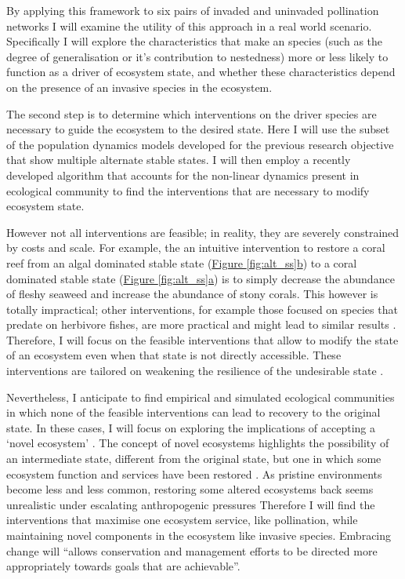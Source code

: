 \documentclass[a4paper]{article}
\begin{document}
By applying this framework to six pairs of invaded and uninvaded pollination networks \autocite{Bartomeus2008} I will examine the utility of this approach in a real world scenario.
Specifically I will explore the characteristics that make an species (such as the degree of generalisation or it's contribution to nestedness) more or less likely to function as a driver of ecosystem state, and whether these characteristics depend on the presence of an invasive species in the ecosystem.

The second step is to determine which interventions on the driver species are necessary to guide the ecosystem to the desired state.
Here I will use the subset of the population dynamics models developed for the previous research objective that show multiple alternate stable states.
I will then employ a recently developed algorithm that accounts for the non-linear dynamics present in ecological community \autocite{Cornelius2013, Cornelius2013a} to find the interventions that are necessary to modify ecosystem state.

However not all interventions are feasible; in reality, they are severely constrained by costs and scale.
For example, the an intuitive intervention to restore a coral reef from an algal dominated stable state (\hyperref[fig:alt_ss]{Figure \ref{fig:alt_ss}b}) to a coral dominated stable state (\hyperref[fig:alt_ss]{Figure \ref{fig:alt_ss}a}) is to simply decrease the abundance of fleshy seaweed and increase the abundance of stony corals.
This however is totally impractical; other interventions, for example those focused on species that predate on herbivore fishes, are more practical and might lead to similar results \autocite{Bennett2015}.
Therefore, I will focus on the feasible interventions that allow to modify the state of an ecosystem even when that state is not directly accessible.
These interventions are tailored on weakening the resilience of the undesirable state \autocite{Graham2013a, Standish2014a, Selkoe2015}.

Nevertheless, I anticipate to find empirical and simulated ecological communities in which none of the feasible interventions can lead to recovery to the original state.
In these cases, I will focus on exploring the implications of accepting a `novel ecosystem' \autocite{Hobbs2006}.
The concept of novel ecosystems highlights the possibility of an intermediate state, different from the original state, but one in which some ecosystem function and services have been restored \autocite{Graham2014a, Graham2015a}.
As pristine environments become less and less common, restoring some altered ecosystems back seems unrealistic under escalating anthropogenic pressures \autocite{Graham2015a}
Therefore I will find the interventions that maximise one ecosystem service, like pollination, while maintaining novel components in the ecosystem like invasive species.
Embracing change will ``allows conservation and management efforts to be directed more appropriately towards goals that are achievable''\autocite{Graham2014a}.
\end{document}
